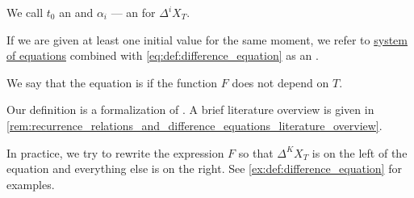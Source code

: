 \begin{definition}
\begin{thmenum}
    We call \( t_0 \) an  and \( \alpha_i \) --- an  for \( \Delta^i X_T \).

    If we are given at least one initial value for the same moment, we refer to \hyperref[def:system_of_equations]{system of equations} combined with \eqref{eq:def:difference_equation} as an .

     We say that the equation is  if the function \( F \) does not depend on \( T \).
  \end{thmenum}
\end{definition}
\begin{comments}
  \item Our definition is a formalization of \cite[307]{Гельфонд1959ИсчислениеКонечныхРазностей}. A brief literature overview is given in \cref{rem:recurrence_relations_and_difference_equations_literature_overview}.

  \item In practice, we try to rewrite the expression \( F \) so that \( \Delta^K X_T \) is on the left of the equation and everything else is on the right. See \cref{ex:def:difference_equation} for examples.
\end{comments}


